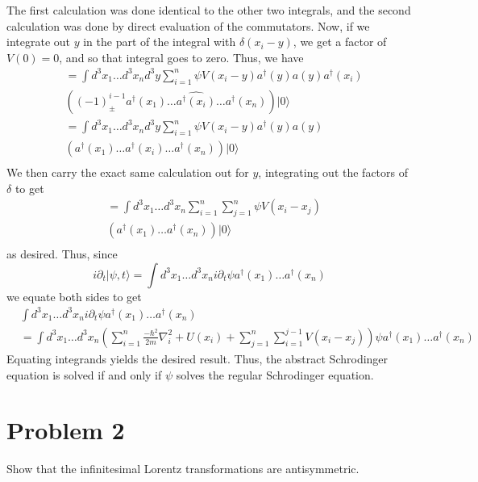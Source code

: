 \documentclass[fontsize=11pt]{scrartcl} %
\numberwithin{equation}{section} %
\numberwithin{figure}{section} %
\numberwithin{table}{section} %
\newcommand{\ad}{a^{\dagger}}
\begin{document}
The first calculation was done identical to the other two integrals, and the
second calculation was done by direct evaluation of the commutators. Now, if we
integrate out $y$ in the part of the integral with $\delta(x_i-y)$, we get a
factor of $V(0) = 0$, and so that integral goes to zero. Thus, we have
\[
    \begin{aligned}
        &= \int d^3x_1\dots d^3x_nd^3y \sum_{i=1}^n\psi V(x_i-y)\ad(y)a(y)\ad(x_i)\\
        &\left( 
            (-1)^{i-1}_{\pm}\ad(x_1)\dots\hat{\ad(x_i)}\dots\ad(x_n)
        \right)|0\rangle\\
        &= \int d^3x_1\dots d^3x_nd^3y \sum_{i=1}^n\psi V(x_i-y)\ad(y)a(y)\\
        &\left( 
            \ad(x_1)\dots\ad(x_i)\dots\ad(x_n)
        \right)|0\rangle\\
    \end{aligned}
\]
We then carry the exact same calculation out for $y$, integrating out the
factors of $\delta$ to get
\[
    \begin{aligned}
        &= \int d^3x_1\dots d^3x_n\sum_{i=1}^n\sum_{j=1}^n\psi V(x_i-x_j)\\
        &\left( 
            \ad(x_1)\dots\ad(x_n)
        \right)|0\rangle\\
    \end{aligned}
\]
as desired. Thus, since
\[
    i\partial_t|\psi,t\rangle = \int d^3x_1\dots d^3x_n i\partial_t\psi
    \ad(x_1)\dots\ad(x_n)
\]
we equate both sides to get
\[
    \begin{aligned}
        &\int d^3x_1\dots d^3x_ni\partial_t\psi \ad(x_1)\dots\ad(x_n)\\
        &= \int d^3x_1\dots d^3x_n
        \left(
 \sum_{i=1}^n \frac{-\hbar^2}{2m}\nabla^2_i + U(x_i) +
    \sum_{j=1}^n\sum_{i=1}^{j-1}V(x_i-x_j)
\right)\psi \ad(x_1)\dots\ad(x_n)
    \end{aligned}
\]
Equating integrands yields the desired result. Thus, the abstract Schrodinger
equation is solved if and only if $\psi$ solves the regular Schrodinger
equation.

\newpage
\section*{Problem 2}
Show that the infinitesimal Lorentz transformations are antisymmetric.
\end{document}
